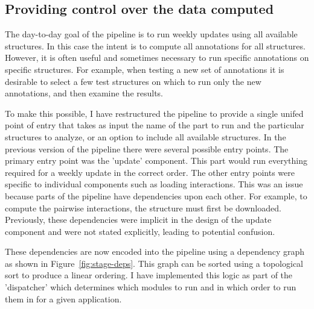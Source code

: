 \subsection{Providing control over the data computed}

The day-to-day goal of the pipeline is to run weekly updates using all available
structures. In this case the intent is to compute all annotations for all
structures. However, it is often useful and sometimes necessary to run specific
annotations on specific structures. For example, when testing a new set of
annotations it is desirable to select a few test structures on which to run only
the new annotations, and then examine the results.

To make this possible, I have restructured the pipeline to provide a single
unifed point of entry that takes as input the name of the part to run and the
particular structures to analyze, or an option to include all available
structures. In the previous version of the pipeline there were several possible
entry points. The primary entry point was the 'update' component. This part
would run everything required for a weekly update in the correct order. The
other entry points were specific to individual components such as loading
interactions. This was an issue because parts of the pipeline have dependencies
upon each other. For example, to compute the pairwise interactions, the
structure must first be downloaded. Previously, these dependencies were implicit
in the design of the update component and were not stated explicitly, leading to
potential confusion.

These dependencies are now encoded into the pipeline using a dependency graph as
shown in Figure~\ref{fig:stage-deps}. This graph can be sorted using a topological
sort to produce a linear ordering. I have implemented this logic as part of the
'dispatcher' which determines which modules to run and in which order to run
them in for a given application.


